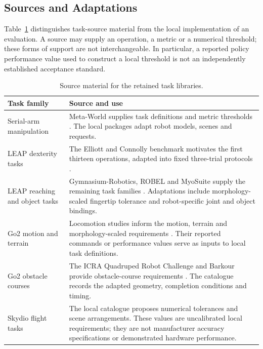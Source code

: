 \subsection{Sources and Adaptations}

Table~\ref{tab:appendix-standard-sources} distinguishes task-source material
from the local implementation of an evaluation.
A source may supply an operation, a metric or a numerical threshold;
these forms of support are not interchangeable.
In particular, a reported policy performance value used to construct a local
threshold is not an independently established acceptance standard.

\begin{table}[htbp]
  \centering
  \begingroup
  \small
  \setlength{\tabcolsep}{4pt}
  \renewcommand{\arraystretch}{1.18}
  \caption{Source material for the retained task libraries.}
  \label{tab:appendix-standard-sources}
  \begin{tabularx}{\textwidth}{@{}>{\raggedright\arraybackslash}p{36mm}
    >{\raggedright\arraybackslash}X@{}}
    \toprule
    \textbf{Task family} & \textbf{Source and use} \\
    \midrule
    Serial-arm manipulation &
    Meta-World supplies task definitions and metric thresholds
    \citep{yu2020metaworld,farama2026metaworld}. The local packages adapt
    robot models, scenes and requests. \\
    LEAP dexterity tasks &
    The Elliott and Connolly benchmark motivates the first thirteen
    operations, adapted into fixed three-trial protocols
    \citep{coulson2021elliott}. \\
    LEAP reaching and object tasks &
    Gymnasium-Robotics, ROBEL and MyoSuite supply the remaining task families
    \citep{delazcano2026gymnasiumrobotics,ahn2020robel,robel2020software,
    caggiano2022myosuite,myohub2026myosuite}.
    Adaptations include morphology-scaled fingertip tolerance and
    robot-specific joint and object bindings. \\
    Go2 motion and terrain &
    Locomotion studies inform the motion, terrain and morphology-scaled
    requirements \citep{lee2020quadrupedal,miki2022perceptive,
    shi2023terrain,hutter2016anymal}. Their reported commands or performance
    values serve as inputs to local task definitions. \\
    Go2 obstacle courses &
    The ICRA Quadruped Robot Challenge and Barkour provide obstacle-course
    requirements \citep{jacoff2023quadruped,caluwaerts2023barkour,
    yu2024barkourdesign}. The catalogue records the adapted geometry,
    completion conditions and timing. \\
    Skydio flight tasks &
    The local catalogue proposes numerical tolerances and scene arrangements.
    These values are uncalibrated local requirements; they are not
    manufacturer accuracy specifications or demonstrated hardware performance. \\
    \bottomrule
  \end{tabularx}
  \endgroup
\end{table}

